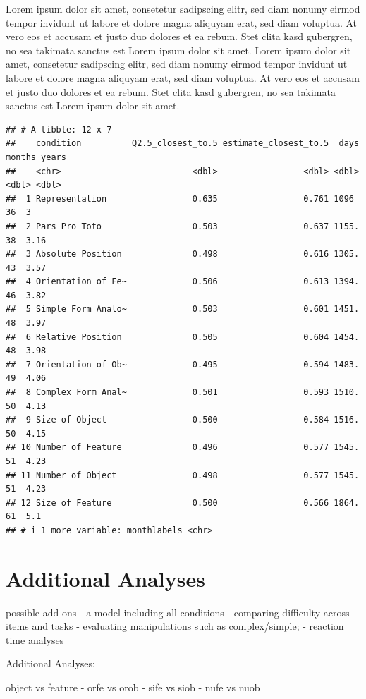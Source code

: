 \documentclass[
  man]{apa6}
\begin{document}
Lorem ipsum dolor sit amet, consetetur sadipscing elitr, sed diam nonumy eirmod tempor invidunt ut labore et dolore magna aliquyam erat, sed diam voluptua. At vero eos et accusam et justo duo dolores et ea rebum. Stet clita kasd gubergren, no sea takimata sanctus est Lorem ipsum dolor sit amet. Lorem ipsum dolor sit amet, consetetur sadipscing elitr, sed diam nonumy eirmod tempor invidunt ut labore et dolore magna aliquyam erat, sed diam voluptua. At vero eos et accusam et justo duo dolores et ea rebum. Stet clita kasd gubergren, no sea takimata sanctus est Lorem ipsum dolor sit amet.

\begin{verbatim}
## # A tibble: 12 x 7
##    condition          Q2.5_closest_to.5 estimate_closest_to.5  days months years
##    <chr>                          <dbl>                 <dbl> <dbl>  <dbl> <dbl>
##  1 Representation                 0.635                 0.761 1096      36  3   
##  2 Pars Pro Toto                  0.503                 0.637 1155.     38  3.16
##  3 Absolute Position              0.498                 0.616 1305.     43  3.57
##  4 Orientation of Fe~             0.506                 0.613 1394.     46  3.82
##  5 Simple Form Analo~             0.503                 0.601 1451.     48  3.97
##  6 Relative Position              0.505                 0.604 1454.     48  3.98
##  7 Orientation of Ob~             0.495                 0.594 1483.     49  4.06
##  8 Complex Form Anal~             0.501                 0.593 1510.     50  4.13
##  9 Size of Object                 0.500                 0.584 1516.     50  4.15
## 10 Number of Feature              0.496                 0.577 1545.     51  4.23
## 11 Number of Object               0.498                 0.577 1545.     51  4.23
## 12 Size of Feature                0.500                 0.566 1864.     61  5.1 
## # i 1 more variable: monthlabels <chr>
\end{verbatim}

\section{Additional Analyses}\label{additional-analyses}

possible add-ons
- a model including all conditions
- comparing difficulty across items and tasks
- evaluating manipulations such as complex/simple;
- reaction time analyses

Additional Analyses:

object vs feature
- orfe vs orob
- sife vs siob
- nufe vs nuob
\end{document}
